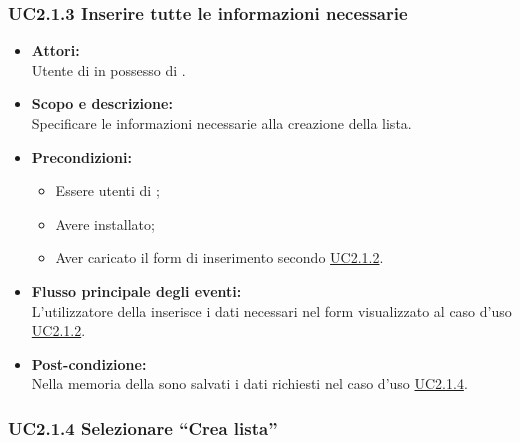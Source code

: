 \subsubsection{UC2.1.3 Inserire tutte le informazioni necessarie} \label{UC2.1.3}

\begin{itemize}
	\item \textbf{Attori:}
	\\Utente di  in possesso di \ProjectName{}.
	\item \textbf{Scopo e descrizione:} 
	\\Specificare le informazioni necessarie alla creazione della lista.
	\item \textbf{Precondizioni:}
	\begin{itemize}
		\item Essere utenti di ;
		\item Avere \ProjectName{} installato;
		\item Aver caricato il form di inserimento secondo \hyperref[UC2.1.2]{UC2.1.2}.
	\end{itemize}
	\item \textbf{Flusso principale degli eventi:}
	\\L'utilizzatore della  inserisce i dati necessari nel form visualizzato al caso d'uso \hyperref[UC2.1.2]{UC2.1.2}.
	\item \textbf{Post-condizione:}
	\\Nella memoria della  sono salvati i dati richiesti nel caso d'uso \hyperref[UC2.1.4]{UC2.1.4}. 
\end{itemize}

\subsubsection{UC2.1.4 Selezionare “Crea lista”} \label{UC2.1.4}

